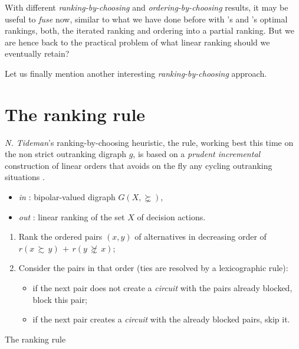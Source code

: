 With different \emph{ranking-by-choosing} and \emph{ordering-by-choosing} results, it may be useful to \emph{fuse} now, similar to what we have done before with \Kemeny 's and \Slater 's optimal rankings, both, the iterated \NetFlows ranking and ordering into a partial ranking. But we are hence back to the practical problem of what linear ranking should we eventually retain? 

Let us finally mention another interesting \emph{ranking-by-choosing} approach.

\vspace{\baselineskip}

\section{The \RankedPairs ranking rule}
\label{sec:8.7}

\emph{N. Tideman}'s  ranking-by-choosing heuristic, the \RankedPairs rule, working best this time on the non strict outranking digraph $g$, is based on a \emph{prudent incremental} construction of linear orders that avoids on the fly any cycling outranking situations \citep{TID-1987}.

\begin{algorithm}[H]
  {\normalsize
\begin{itemize}
 \item [] \emph{in} : bipolar-valued digraph $G(X,\succnsim)$,
 \item [] \emph{out} : linear ranking of the set $X$ of decision actions.
\end{itemize}
\begin{enumerate}[leftmargin=0.5cm,rightmargin=0.5cm,topsep=1pt]
 \item Rank the ordered pairs $(x,y)$ of alternatives in decreasing order of $r(x\, \succsim \,y) \,+\, r(y\, \not\succsim \,x)$;
 \item Consider the pairs in that order (ties are resolved by a lexicographic rule):
   \begin{itemize}[nosep]
     \item if the next pair does not create a \emph{circuit} with the pairs already blocked, block this pair;
     \item if the next pair creates a \emph{circuit} with the already blocked pairs, skip it.
    \end{itemize}
  \end{enumerate}
  }
  \caption{The \RankedPairs ranking rule}
  \label{alg:8.5}
\end{algorithm}  

